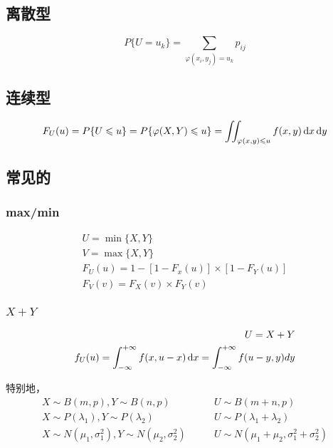 \subsection{离散型}
\label{sub:离散型}

\[
    P\{ U=u_k \} = \sum_{\varphi(x_i, y_j) = u_k} p_{ij}
\]

\subsection{连续型}
\label{sub:连续型}

\[
    F_U(u) = P\{U \leqslant u  \} = P\{\varphi(X,Y)\leqslant u \} = \iint_{\varphi(x,y) \leqslant u} f(x,y) \dif x \dif y
\]

\subsection{常见的}
\label{sub:常见的}

\subsubsection{max/min}
\label{ssub:max_min}

\begin{gather}
    U = \min \{X, Y\} \\
    V = \max \{X, Y \} \\
    F_U(u) = 1 - \left[1-F_x(u)\right] \times \left[1-F_Y(u)\right] \\
    F_V(v) = F_X(v) \times F_Y(v)
\end{gather}

\subsubsection{$X+Y$}
\label{ssub:_x_y_}

\[
    \begin{aligned}
        U = X + Y  \\
        f_U(u) = \int_{-\infty}^{+\infty} f(x, u-x) \dif x = \int_{-\infty}^{+\infty} f(u-y, y) dy
    \end{aligned}
\]

特别地，
\begin{align}
    X \sim B(m,p), Y \sim B(n,p) \quad & \quad U \sim B(m+n, p) \\
    X \sim P(\lambda_1), Y \sim P(\lambda_2) \quad & \quad U \sim P(\lambda_1 + \lambda_2) \\
    X \sim N(\mu_1,\sigma_1^2), Y \sim N(\mu_2, \sigma_2^2) \quad & \quad U \sim N(\mu_1 + \mu_2, \sigma_1^2 + \sigma_2^2)
\end{align}
